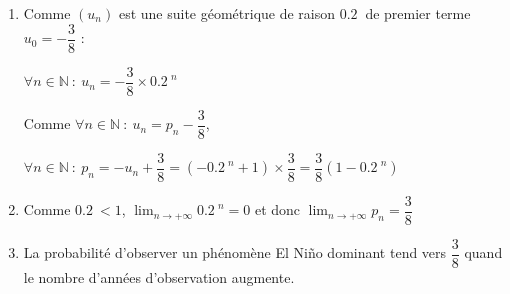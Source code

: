 \documentclass[10pt]{article}
\providecommand{\N}{\mathbb{N}}
\providecommand{\np}[2][]{{#2~#1}}
\begin{document}
\begin{enumerate}
\begin{enumerate}
Finalement quel que soit $n$ naturel, $u_{n+1} = \np{0.2}\times u_{n}$ : ceci prouve que $\left(u_n\right)$ est une suite géométrique de raison $\np{0.2}$.

			$u_0 = p_{0} - \dfrac{3}{8} = 0 - \dfrac{3}{8} = -\dfrac{3}{8}$

			Le premier terme est donné par : ${u_0 = - \dfrac{3}{8}}$

			\item Comme $\left(u_n\right)$ est une suite géométrique de raison $\np{0.2}$ de premier terme ${u_0 = - \dfrac{3}{8}}$ :

			$\forall n \in \N~:~u_n = - \dfrac{3}{8} \times \np{0.2}^{n} $

			Comme $\forall n \in \N~:~u_n = p_{n} - \dfrac{3}{8}$,

			$\forall n \in \N~:~p_n = -u_{n} + \dfrac{3}{8} = \left(-\np{0.2}^{n} +1 \right)\times \dfrac{3}{8} = \dfrac{3}{8}\left(1-\np{0.2}^{n}  \right)$
			
			\item
			Comme $\np{0.2}<1$, $\displaystyle\lim_{n\rightarrow +\infty}\np{0.2}^{n} = 0$ et donc $\displaystyle\lim_{n\rightarrow +\infty}p_{n} = \dfrac{3}{8}$
			\item La probabilité d'observer un phénomène El Niño dominant tend vers $\dfrac{3}{8}$ quand le nombre d'années d'observation augmente.
		\end{enumerate}	
\end{enumerate}
\end{document}
